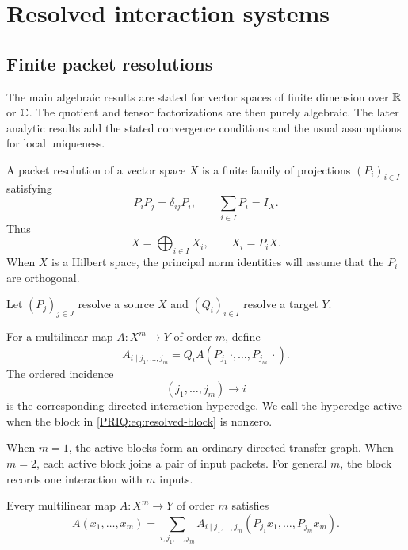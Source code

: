 \section{Resolved interaction systems}\label{PRIQ:sec:resolved}

\subsection{Finite packet resolutions}
The main algebraic results are stated for vector spaces of finite dimension over $\mathbb R$ or $\mathbb C$.  The quotient and tensor factorizations are then purely algebraic.  The later analytic results add the stated convergence conditions and the usual assumptions for local uniqueness.

\begin{PRIQdefinition}\label{PRIQ:def:packet-resolution}
A packet resolution of a vector space $X$ is a finite family of projections $(P_i)_{i\in I}$ satisfying
\[
  P_iP_j=\delta_{ij}P_i,
  \qquad
  \sum_{i\in I}P_i=I_X.
\]
Thus
\[
  X=\bigoplus_{i\in I}X_i,
  \qquad X_i=P_iX.
\]
When $X$ is a Hilbert space, the principal norm identities will assume that the $P_i$ are orthogonal.
\end{PRIQdefinition}

Let $(P_j)_{j\in J}$ resolve a source $X$ and $(Q_i)_{i\in I}$ resolve a target $Y$.

\begin{PRIQdefinition}\label{PRIQ:def:resolved-block}
For a multilinear map $A:X^m\to Y$ of order $m$, define
\begin{equation}\label{PRIQ:eq:resolved-block}
  A_{i\mid j_1,\ldots,j_m}
  =
  Q_iA(P_{j_1}\,\cdot,\ldots,P_{j_m}\,\cdot).
\end{equation}
The ordered incidence
\[
  (j_1,\ldots,j_m)\longrightarrow i
\]
is the corresponding directed interaction hyperedge.  We call the hyperedge active when the block in \eqref{PRIQ:eq:resolved-block} is nonzero.
\end{PRIQdefinition}

When $m=1$, the active blocks form an ordinary directed transfer graph.  When $m=2$, each active block joins a pair of input packets.  For general $m$, the block records one interaction with $m$ inputs.

\begin{PRIQtheorem}\label{PRIQ:thm:packet-reconstruction}
Every multilinear map $A:X^m\to Y$ of order $m$ satisfies
\begin{equation}\label{PRIQ:eq:packet-reconstruction}
  A(x_1,\ldots,x_m)
  =
  \sum_{i,j_1,\ldots,j_m}
  A_{i\mid j_1,\ldots,j_m}
  (P_{j_1}x_1,\ldots,P_{j_m}x_m).
\end{equation}
\end{PRIQtheorem}

